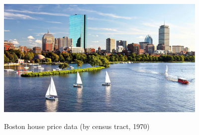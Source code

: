 \documentclass{beamer}\usepackage[]{graphicx}\usepackage[]{color}
\begin{document}
\begin{darkframes}
\begin{frame}
    \end{frame}






    \begin{frame}

      \begin{center}
        \includegraphics[width=4in]{boston} \\
      \end{center}

      Boston house price data (by census tract, 1970)
    \end{frame}







    \begin{frame}


\end{frame}
\end{darkframes}
\end{document}
